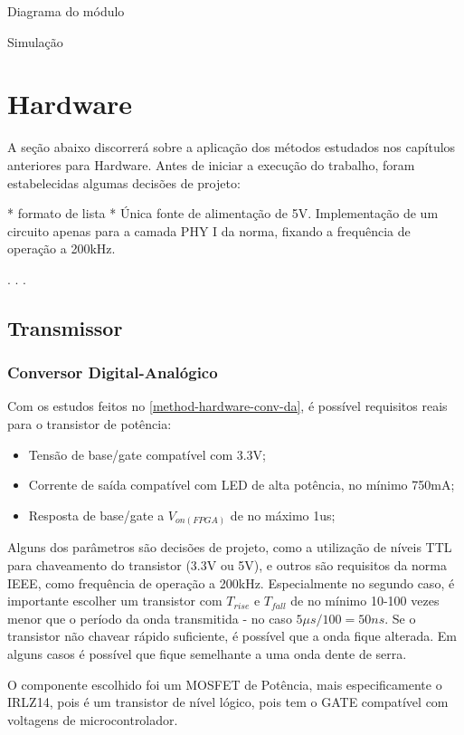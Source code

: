 	Diagrama do módulo
	
	Simulação
	
	\section{Hardware}
	A seção abaixo discorrerá sobre a aplicação dos métodos estudados nos capítulos anteriores para Hardware.
	Antes de iniciar a execução do trabalho, foram estabelecidas algumas decisões de projeto:
	
	* formato de lista *
	Única fonte de alimentação de 5V.
	Implementação de um circuito apenas para a camada PHY I da norma, fixando a frequência de operação a 200kHz.
	
	. . .
	
	
	\subsection{Transmissor}
	
	\subsubsection{Conversor Digital-Analógico}
		Com os estudos feitos no \autoref{method-hardware-conv-da}, é possível requisitos reais para o transistor de potência:

		\begin{itemize}
			\item Tensão de base/gate compatível com 3.3V;
			\item Corrente de saída compatível com LED de alta potência, no mínimo 750mA;
			\item Resposta de base/gate a $V_{on(FPGA)}$ de no máximo 1us;
		\end{itemize}
		
		Alguns dos parâmetros são decisões de projeto, como a utilização de níveis TTL para chaveamento do transistor (3.3V ou 5V), e outros são requisitos da norma IEEE, como frequência de operação a 200kHz. Especialmente no segundo caso, é importante escolher um transistor com $T_{rise}$ e $T_{fall}$ de no mínimo 10-100 vezes menor que o período da onda transmitida - no caso $5\mu$$s/100 = 50ns$. Se o transistor não chavear rápido suficiente, é possível que a onda fique alterada. Em alguns casos é possível que fique semelhante a uma onda dente de serra.
		
		O componente escolhido foi um MOSFET de Potência, mais especificamente o IRLZ14, pois é um transistor de nível lógico, pois tem o GATE compatível com voltagens de microcontrolador. 
		
